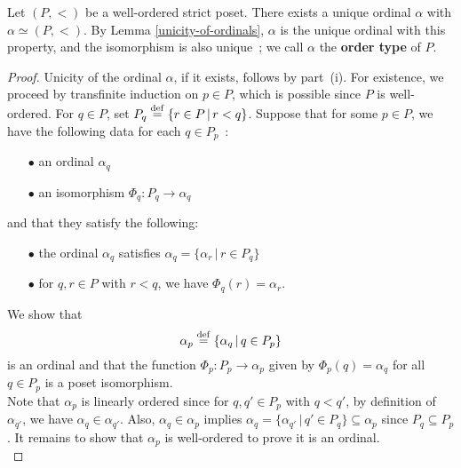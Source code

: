 \begin{theorem} \label{existence-of-the-order-type}
    Let $(P,<)$ be a well-ordered strict poset. There exists a unique ordinal $\alpha$ with $\alpha \simeq (P,<)$. By Lemma \autoref{unicity-of-ordinals}, $\alpha$ is the unique ordinal with this property, and the isomorphism is also unique~; we call $\alpha$ the \textbf{order type} of $P$. 
    \\
\end{theorem}

\begin{proof}
    Unicity of the ordinal $\alpha$, if it exists, follows by part~(i). For existence, we proceed by transfinite induction on $p \in P$, which is possible since $P$ is well-ordered. For $q \in P$, set $P_q \overset{\mathrm{def}}{=} \{ r \in P \, | \, r < q \}$. Suppose that for some $p \in P$, we have the following data for each $q \in P_p$~:
    \\

    \begin{itemize}
        \item[$\bullet$] an ordinal $\alpha_q$
        \\

        \item[$\bullet$] an isomorphism $\Phi_q : P_q \to \alpha_q$
        \\

    \end{itemize}
    and that they satisfy the following:
    \\

    \begin{itemize}
        \item[$\bullet$] the ordinal $\alpha_q$ satisfies $\alpha_q = \{ \alpha_r \, | \, r \in P_q \}$
        \\            
        
        \item[$\bullet$] for $q,r \in P$ with $r < q$, we have $\Phi_q(r) = \alpha_r$.
        \\ 
    \end{itemize}

    We show that 
    \[
        \alpha_p \overset{\mathrm{def}}{=} \{ \alpha_q \, | \, q \in P_p \}    
    \]
    is an ordinal and that the function $\Phi_p : P_p \to \alpha_p$ given by $\Phi_p(q) = \alpha_q$ for all $q \in P_p$ is a poset isomorphism. 
    \\

    Note that $\alpha_p$ is linearly ordered since for $q,q' \in P_p$ with $q < q'$, by definition of $\alpha_{q'}$, we have $\alpha_q \in \alpha_{q'}$. Also, $\alpha_q \in \alpha_p$ implies $\alpha_q = \{ \alpha_{q'} \, | \, q' \in P_q \} \subseteq \alpha_p$ since $P_q \subseteq P_p$. It remains to show that $\alpha_p$ is well-ordered to prove it is an ordinal.
    \\
    

\end{proof}
